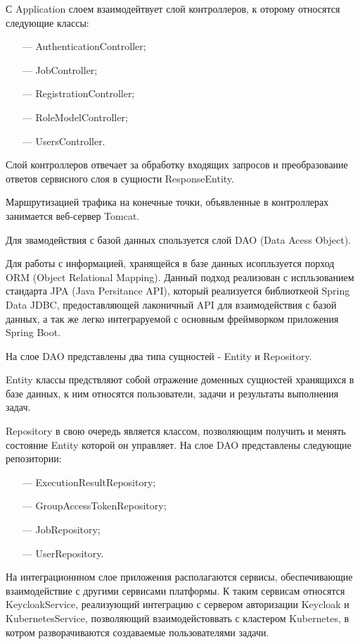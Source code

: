 С Application слоем взаимодейтвует слой контроллеров, к оторому относятся следующие классы:

\begin{itemize}
\item[---] AuthenticationController;
\item[---] JobController;
\item[---] RegistrationController;
\item[---] RoleModelController;
\item[---] UsersController.
\end{itemize}

Слой контроллеров отвечает за обработку входящих запросов и преобразование ответов сервисного слоя в сущности ResponseEntity.

Маршрутизацией трафика на конечные точки, объявленные в контроллерах занимается веб-сервер Tomcat.

Для звамодействия с базой данных спользуется слой DAO (Data Acess Object). 

Для работы с информацией, хранящейся в базе данных исопльзуется порход ORM (Object Relational Mapping)\cite{o2008object}. Данный подход реализован с испльзованием стандарта JPA (Java Persitance API)\cite{yang2010java}, который реализуется библиоткеой Spring Data JDBC, предоставляющей лаконичный API для взаимодействия с базой данных, а так же легко интеграруемой с основным фреймворком приложения Spring Boot.

На слое DAO представлены два типа сущностей - Entity и Repository.

Entity классы предствляют собой отражение доменных сущностей хранящихся в базе данных, к ним относятся пользователи, задачи и результаты выполнения задач. 

Repository в свою очередь является классом, позволяющим получить и менять состояние Entity которой он управляет. На слое DAO представлены следующие репозитории:

\begin{itemize}
\item[---] ExecutionResultRepository;
\item[---] GroupAccessTokenRepository;
\item[---] JobRepository;
\item[---] UserRepository.
\end{itemize}

На интеграционнном слое приложения располагаются сервисы, обеспечивающие взаимодействие с другими сервисами платформы. К таким сервисам относятся KeycloakService, реализующий интеграцию с сервером авторизации Keycloak и KubernetesService, позволяющий взаимодейстоввать с кластером Kubernetes, в котром разворачиваются создаваемые пользователями задачи.


